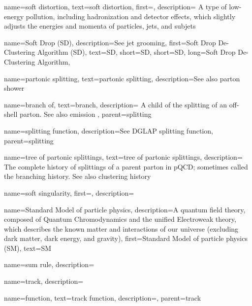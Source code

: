{
  name=soft distortion,
  text=soft distortion,
  first=,
  description={
        A type of low-energy pollution, including hadronization and detector effects, which slightly adjusts the energies and momenta of particles, jets, and subjets
  }
}

{
    name=Soft Drop (SD),
    description={See jet grooming},
    first={Soft Drop De-Clustering Algorithm (SD)},
    text={SD},
    short={SD},
    short={SD},
    long={Soft Drop De-Clustering Algorithm},
}

{
  name=partonic splitting,
  text=partonic splitting,
  description={See also parton shower}
}

    {
      name=branch of,
      text=branch,
      description={
          A child of the splitting of an off-shell parton.
          See also emission
      },
      parent=splitting
    }


    {
      name=splitting function,
      description={See DGLAP splitting function},
      parent=splitting
    }

    {
      name=tree of partonic splittings,
      text=tree of partonic splittings,
      description={
          The complete history of splittings of a parent parton in pQCD;
          sometimes called the branching history.
          See also clustering history
      }
    }



{
  name=soft singularity,
  first=,
  description={}
}


{
  name=Standard Model of particle physics,
  description={A quantum field theory, composed of Quantum Chromodynamics and the unified Electroweak theory, which describes the known matter and interactions of our universe (excluding dark matter, dark energy, and gravity)},
  first=Standard Model of particle physics (SM),
  text=SM
}

{
  name=sum rule,
  description={}
}

{
  name=track,
  description={}
}

    {
      name=function,
      text=track function,
      description={},
      parent=track
    }



